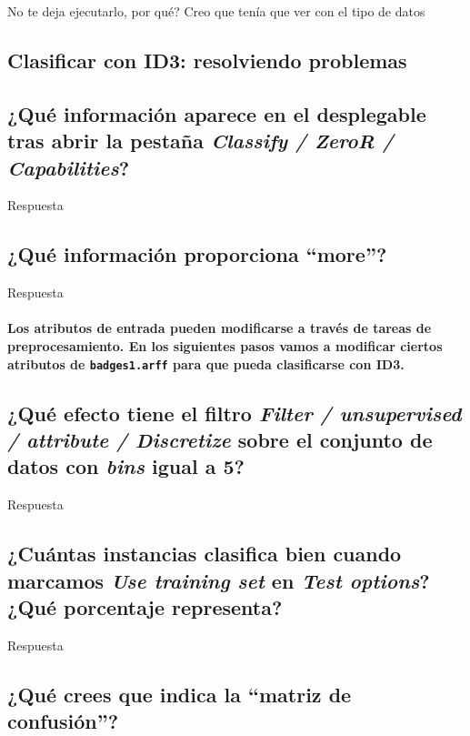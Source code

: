 \documentclass[12pt]{article}
\begin{document}
No te deja ejecutarlo, por qué? Creo que tenía que ver con el tipo de datos

\newpage

\begin{center}
\section{Clasificar con ID3: resolviendo problemas}
\end{center}

\subsection{¿Qué información aparece en el desplegable tras abrir la pestaña
\emph{Classify / ZeroR / Capabilities}?}

Respuesta

\subsection{¿Qué información proporciona ``more''?}

Respuesta

\paragraph{Los atributos de entrada pueden modificarse a través de tareas de
preprocesamiento. En los siguientes pasos vamos a modificar ciertos atributos
de \texttt{badges1.arff} para que pueda clasificarse con ID3.}

\subsection{¿Qué efecto tiene el filtro \emph{Filter / unsupervised / attribute
/ Discretize} sobre el conjunto de datos con \emph{bins} igual a 5?}

Respuesta

\subsection{¿Cuántas instancias clasifica bien cuando marcamos \emph{Use
training set} en \emph{Test options}? ¿Qué porcentaje representa?}

Respuesta

\subsection{¿Qué crees que indica la ``matriz de confusión''?}
\end{document}

